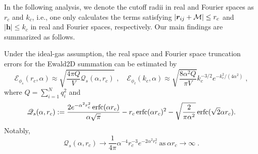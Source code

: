 In the following analysis, we denote the cutoff radii in real and Fourier spaces as $r_c$ and $k_c$, i.e., one only calculates the terms satisfying $\lvert\bm{r}_{ij} + \mathcal{M}\rvert \leq r_c$ and 
$|\bm{h }|\leq k_c$ in real and Fourier spaces, respectively.
Our main findings are summarized as follows. 

\begin{thm}\label{thm:ewald2d_phi_error}
	Under the ideal-gas assumption, the real space and Fourier space truncation errors for the Ewald2D summation can be estimated by
	\begin{equation}\label{eq::Ephi}
		\mathscr{E}_{\phi_s} (r_c, \alpha) \approx \sqrt{\frac{4\pi Q}{V}\mathscr{Q}_{s}(\alpha,r_c)}\;, \quad
		\mathscr{E}_{\phi_\ell} (k_c, \alpha) \approx \sqrt{\frac{8\alpha^2Q}{\pi V}}k_c^{-3/2}e^{-k_c^2/(4\alpha^2)}\;,
	\end{equation}
	where $Q = \sum_{i=1}^{N} q_{i}^2$ and
	\begin{equation}\label{eq::Qs2}
		\mathscr{Q}_{s}(\alpha,r_c):=\frac{2e^{-\alpha^2r_c^2}\operatorname{erfc}(\alpha r_c)}{\alpha\sqrt{\pi}}-r_c\operatorname{erfc}(\alpha r_c)^2-\sqrt{\frac{2}{\pi\alpha^2}}\operatorname{erfc}(\sqrt{2}\alpha r_c).
	\end{equation}
	Notably,
	\begin{equation}\label{eq::Qs}
		\mathscr{Q}_{s}(\alpha,r_c)\rightarrow\frac{1}{4\pi}\alpha^{-4} r_c^{-3}e^{-2\alpha^2r_c^2}~\text{as}~\alpha r_c\rightarrow \infty\;. 
	\end{equation}
\end{thm}

